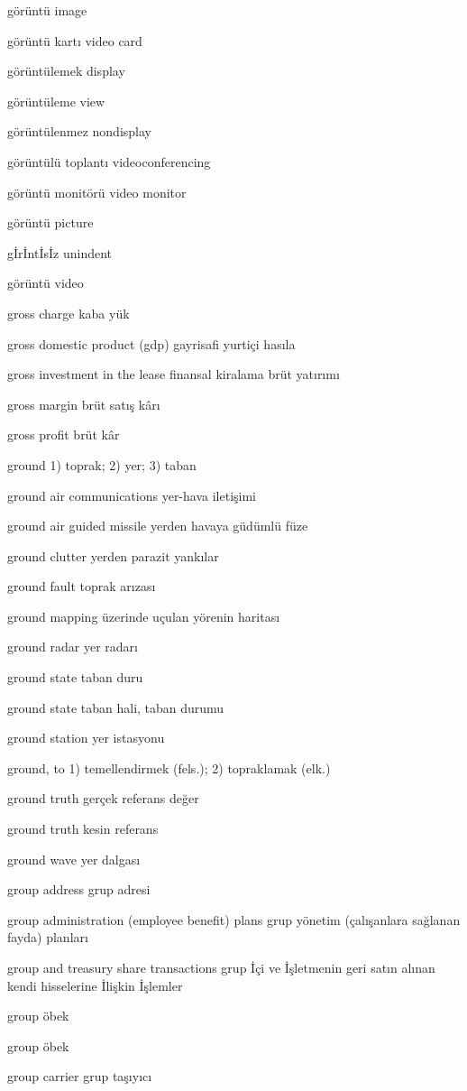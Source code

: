 \documentclass[12pt,fleqn]{article}\usepackage{../../common}
\begin{document}
görüntü image

görüntü kartı video card

görüntülemek display

görüntüleme view

görüntülenmez nondisplay

görüntülü toplantı videoconferencing

görüntü monitörü video monitor

görüntü picture

gİrİntİsİz unindent

görüntü video

gross charge kaba yük

gross domestic product (gdp) gayrisafi yurtiçi hasıla 

gross investment in the lease finansal kiralama brüt yatırımı

gross margin brüt satış kârı

gross profit brüt kâr

ground 1) toprak; 2) yer; 3) taban

ground air communications yer-hava iletişimi

ground air guided missile yerden havaya güdümlü füze

ground clutter yerden parazit yankılar

ground fault toprak arızası

ground mapping üzerinde uçulan yörenin haritası

ground radar yer radarı

ground state taban duru

ground state taban hali, taban durumu

ground station yer istasyonu

ground, to 1) temellendirmek (fels.); 2) topraklamak (elk.)

ground truth gerçek referans değer

ground truth kesin referans

ground wave yer dalgası

group address grup adresi

group administration (employee benefit) plans grup yönetim (çalışanlara sağlanan fayda) planları

group and treasury share transactions grup İçi ve İşletmenin geri satın alınan kendi hisselerine İlişkin İşlemler

group öbek

group öbek

group carrier grup taşıyıcı
\end{document}
